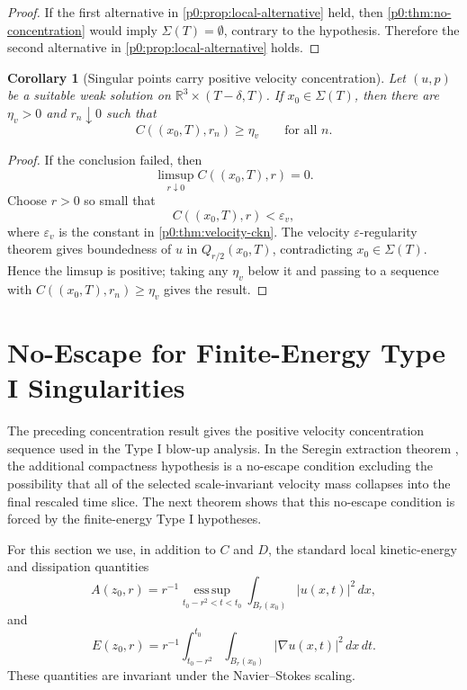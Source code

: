 \documentclass[11pt]{amsart}
\theoremstyle{plain}
\newtheorem{corollary}[corollary]{Corollary}
\theoremstyle{definition}
\theoremstyle{remark}
\numberwithin{equation}{section}
\begin{document}
\begin{proof}
If the first alternative in \cref{p0:prop:local-alternative} held, then
\cref{p0:thm:no-concentration} would imply \(\Sigma(T)=\emptyset\), contrary to
the hypothesis.  Therefore the second alternative in
\cref{p0:prop:local-alternative} holds.
\end{proof}

\begin{corollary}[Singular points carry positive velocity concentration]
\label{p0:cor:velocity-concentration}
Let \((u,p)\) be a suitable weak solution on
\(\mathbb R^3\times(T-\delta,T)\).  If \(x_0\in\Sigma(T)\), then there are
\(\eta_v>0\) and \(r_n\downarrow0\) such that
\[
  C((x_0,T),r_n)\ge\eta_v
  \qquad\text{for all }n.
\]
\end{corollary}

\begin{proof}
If the conclusion failed, then
\[
  \limsup_{r\downarrow0} C((x_0,T),r)=0.
\]
Choose \(r>0\) so small that
\[
  C((x_0,T),r)<\varepsilon_v,
\]
where \(\varepsilon_v\) is the constant in
\cref{p0:thm:velocity-ckn}.  The velocity \(\varepsilon\)-regularity theorem gives
boundedness of \(u\) in \(Q_{r/2}(x_0,T)\), contradicting
\(x_0\in\Sigma(T)\).  Hence the limsup is positive; taking any
\(\eta_v\) below it and passing to a sequence with
\(C((x_0,T),r_n)\ge\eta_v\) gives the result.
\end{proof}

\section{No-Escape for Finite-Energy Type I Singularities}
\label{p0:sec:auto-no-escape}

The preceding concentration result gives the positive velocity concentration
sequence used in the Type I blow-up analysis.  In the Seregin extraction
theorem , the
additional compactness hypothesis is a no-escape condition excluding the possibility
that all of the selected scale-invariant velocity mass collapses into the
final rescaled time slice.  The next theorem shows that this no-escape condition is
forced by the finite-energy Type I hypotheses.

For this section we use, in addition to \(C\) and \(D\), the standard local
kinetic-energy and dissipation quantities
\[
  A(z_0,r)
  =r^{-1}\operatorname*{ess\,sup}_{t_0-r^2<t<t_0}
    \int_{B_r(x_0)} |u(x,t)|^2\,dx,
\]
and
\[
  E(z_0,r)
  =r^{-1}\int_{t_0-r^2}^{t_0}\int_{B_r(x_0)}
    |\nabla u(x,t)|^2\,dx\,dt .
\]
These quantities are invariant under the Navier--Stokes scaling.
\end{document}
